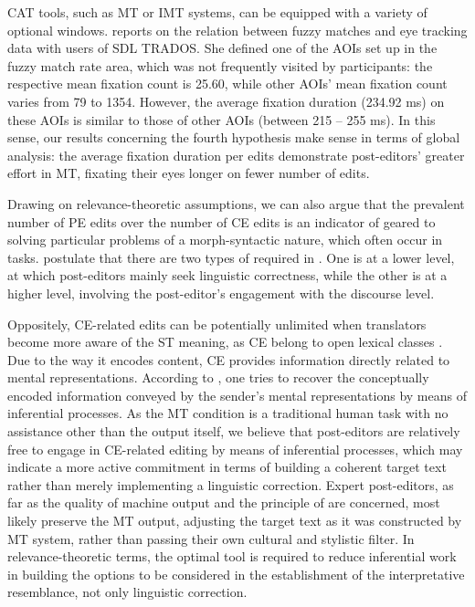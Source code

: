 \documentclass[output=paper]{langsci/langscibook}
\begin{document}
CAT tools, such as MT or IMT systems, can be equipped with a variety of optional windows. \citet{obrien2008} reports on the relation between fuzzy matches and eye tracking data with users of SDL TRADOS. She defined one of the AOIs set up in the fuzzy match rate area, which was not frequently visited by participants: the respective mean fixation count is 25.60, while other AOIs' mean fixation count varies from 79 to 1354. However, the average fixation duration (234.92 ms) on these AOIs is similar to those of other AOIs (between 215 -- 255 ms). In this sense, our results concerning the fourth hypothesis make sense in terms of global analysis: the average fixation duration per edits demonstrate post-editors' greater effort in MT, fixating their eyes longer on fewer number of edits. 



Drawing on relevance-theoretic assumptions, we can also argue that the prevalent number of PE edits over the number of CE edits is an indicator of  geared to solving particular problems of a morph-syntactic nature, which often occur in  tasks. \citet{krings2001} postulate that there are two types of  required in . One is at a lower level, at which post-editors mainly seek linguistic correctness, while the other is at a higher level, involving the post-editor's engagement with the discourse level.  



\newpage 
Oppositely, CE-related edits can be potentially unlimited when translators become more aware of the ST meaning, as CE belong to open lexical classes \citep{moeschler1998}. Due to the way it encodes content, CE provides information directly related to mental representations. According to \citet{alves2001}, one tries to recover the conceptually encoded information conveyed by the sender's mental representations by means of inferential processes. As the MT condition is a traditional human  task with no assistance other than the  output itself, we believe that post-editors are relatively free to engage in CE-related editing by means of inferential processes, which may indicate a more active commitment in terms of building a coherent target text rather than merely implementing a linguistic correction. Expert post-editors, as far as the quality of machine output and the principle of  are concerned, most likely preserve the MT output, adjusting the target text as it was constructed by MT system, rather than passing their own cultural and stylistic filter. In relevance-theoretic terms, the optimal  tool is required to reduce inferential work in building the options to be considered in the establishment of the interpretative resemblance, not only linguistic correction. 
\end{document}
